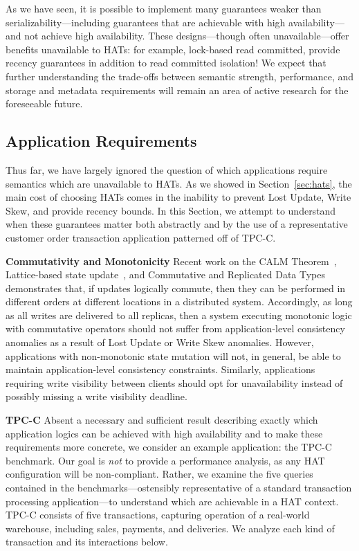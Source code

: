 \vspace{.5em}

As we have seen, it is possible to implement many guarantees weaker
than serializability---including guarantees that are achievable with
high availability---and not achieve high availability. These
designs---though often unavailable---offer benefits unavailable to
HATs: for example, lock-based read committed, provide recency
guarantees in addition to read committed isolation! We expect that
further understanding the trade-offs between semantic strength,
performance, and storage and metadata requirements will remain an area
of active research for the foreseeable future.

\subsection{Application Requirements}

Thus far, we have largely ignored the question of which applications
require semantics which are unavailable to HATs. As we showed in
Section~\ref{sec:hats}, the main cost of choosing HATs comes in the
inability to prevent Lost Update, Write Skew, and provide recency
bounds. In this Section, we attempt to understand when these
guarantees matter both abstractly and by the use of a representative
customer order transaction application patterned off of TPC-C.

\vspace{.5em}\noindent\textbf{Commutativity and Monotonicity} Recent work on
the CALM Theorem~\cite{calm}, Lattice-based state
update~\cite{blooml}, and Commutative and Replicated Data
Types~\cite{crdt} demonstrates that, if updates logically commute,
then they can be performed in different orders at different locations
in a distributed system. Accordingly, as long as all writes are
delivered to all replicas, then a system executing monotonic logic
with commutative operators should not suffer from application-level
consistency anomalies as a result of Lost Update or Write Skew
anomalies. However, applications with non-monotonic state mutation
will not, in general, be able to maintain application-level
consistency constraints. Similarly, applications requiring write
visibility between clients should opt for unavailability instead of
possibly missing a write visibility deadline.

\vspace{.5em}\noindent\textbf{TPC-C} Absent a necessary and sufficient result describing exactly which
application logics can be achieved with high availability and to make
these requirements more concrete, we consider an example application:
the TPC-C benchmark. Our goal is \textit{not} to provide a performance
analysis, as any HAT configuration will be non-compliant. Rather, we
examine the five queries contained in the benchmarks---ostensibly
representative of a standard transaction processing application---to
understand which are achievable in a HAT context. TPC-C consists of
five transactions, capturing operation of a real-world warehouse,
including sales, payments, and deliveries. We analyze each kind of
transaction and its interactions below.

